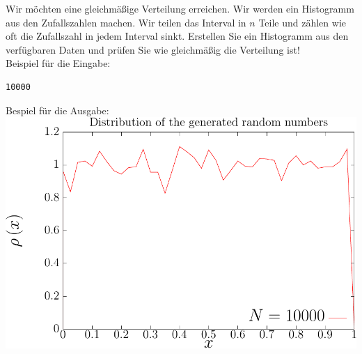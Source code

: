 \documentclass{article}[12pt]
\begin{document}
Wir möchten eine gleichmäßige Verteilung erreichen. Wir werden ein Histogramm aus den Zufallszahlen machen. Wir teilen 
das Interval in $n$ Teile und z\"ahlen wie oft die Zufallszahl in jedem Interval sinkt. Erstellen Sie ein Histogramm aus 
den verfügbaren Daten und prüfen Sie wie gleichmäßig die Verteilung ist!
\\
Beispiel für die Eingabe:
\begin{lstlisting}
10000
\end{lstlisting}
Bespiel für die Ausgabe:\\
\includegraphics[width=.8\linewidth]{dist1.pdf}
\end{document}
